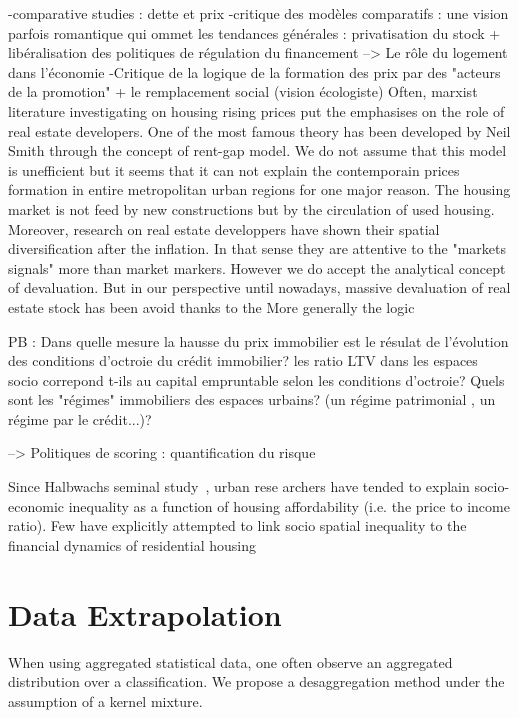 -comparative studies : dette et prix
-critique des modèles comparatifs : une vision parfois romantique qui ommet les tendances générales : privatisation du stock + libéralisation des politiques de régulation du financement
--> Le rôle du logement dans l'économie
-Critique de la logique de la formation des prix par des "acteurs de la promotion" + le remplacement social (vision écologiste)
Often, marxist literature investigating on housing rising prices put the emphasises on the role of real estate developers. One of the most famous theory has been developed by Neil Smith through the concept of rent-gap model. We do not assume that this model is unefficient but it seems that it can not explain the contemporain prices formation in entire metropolitan urban regions for one major reason. The housing market is not feed by new constructions but by the circulation of used housing. Moreover, research on real estate developpers have shown their spatial diversification after the inflation. In that sense they are attentive to the "markets signals" more than market markers. However we do accept the analytical concept of devaluation. But in our perspective until nowadays, massive devaluation of real estate stock has been avoid thanks to the  More generally the logic 

PB : Dans quelle mesure la hausse du prix immobilier est le résulat de l'évolution des conditions d'octroie du crédit immobilier? 
les ratio LTV dans les espaces socio correpond t-ils au capital empruntable selon les conditions d'octroie? Quels sont les "régimes" immobiliers des espaces urbains? (un régime patrimonial , un régime par le crédit...)?

--> Politiques de scoring : quantification du risque

Since Halbwachs seminal study~\cite{halbwachs1913classe}, urban rese
archers have tended to explain socio-economic inequality as  a  function  of  housing  affordability  (i.e.  the  price to
income  ratio).  Few  have  explicitly  attempted  to  link socio spatial  inequality  to  the  financial  dynamics  of  residential  housing




\section{Data Extrapolation}

When using aggregated statistical data, one often observe an aggregated distribution over a classification. We propose a desaggregation method under the assumption of a kernel mixture.

